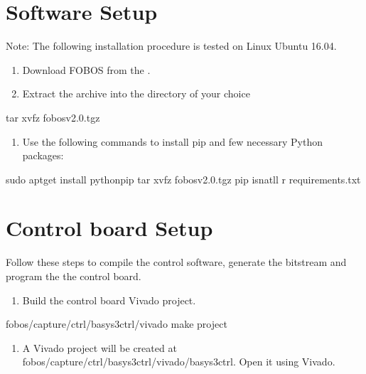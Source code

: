 \documentclass[letterpaper,10pt,english]{sphinxmanual}
\begin{document}
\section{Software Setup}
\label{\detokenize{setup:software-setup}}
Note: The following installation procedure is tested on Linux Ubuntu 16.04.
\begin{enumerate}
%
\item {} 
Download FOBOS from the .

\item {} 
Extract the archive into the directory of your choice

\end{enumerate}

\begin{sphinxVerbatim}[commandchars=\\\{\}]
\PYGZdl{} tar xvfz fobos\PYGZhy{}v2.0.tgz
\end{sphinxVerbatim}
\begin{enumerate}
%
\setcounter{enumi}{2}
\item {} 
Use the following commands to install pip and few necessary Python packages:

\end{enumerate}

\begin{sphinxVerbatim}[commandchars=\\\{\}]
\PYGZdl{} sudo apt\PYGZhy{}get install python\PYGZhy{}pip
\PYGZdl{} tar xvfz fobos\PYGZhy{}v2.0.tgz
\PYGZdl{} pip isnatll \PYGZhy{}r requirements.txt
\end{sphinxVerbatim}


\section{Control board Setup}
\label{\detokenize{setup:control-board-setup}}
Follow these steps to compile the control software, generate the bitstream and program
the the control board.
\begin{enumerate}
%
\item {} 
Build the control board Vivado project.

\end{enumerate}

\begin{sphinxVerbatim}[commandchars=\\\{\}]
\PYGZdl{}  fobos/capture/ctrl/basys3ctrl/vivado
\PYGZdl{} make project
\end{sphinxVerbatim}
\begin{enumerate}
%
\setcounter{enumi}{1}
\item {} 
A Vivado project will be created at fobos/capture/ctrl/basys3ctrl/vivado/basys3ctrl. Open it using Vivado.

\end{enumerate}
\end{document}
